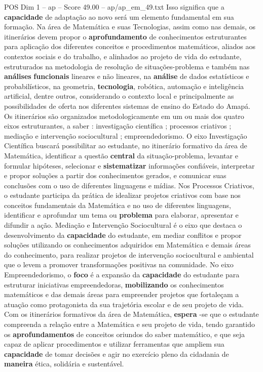 \begin{textsample}{POS Dim 1 – ap – Score 49.00 – ap/ap\_em\_49.txt}
Isso significa que a \textbf{capacidade} de adaptação ao novo será um elemento fundamental em sua formação.
Na área de Matemática e suas Tecnologias, assim como nas demais, os itinerários devem propor o \textbf{aprofundamento} de conhecimentos estruturantes para aplicação dos diferentes conceitos e procedimentos matemáticos, aliados aos contextos sociais e do trabalho, e alinhados ao projeto de vida do estudante, estruturados na metodologia de resolução de situações-problema e também nas \textbf{análises} \textbf{funcionais} lineares e não lineares, na \textbf{análise} de dados estatísticos e probabilísticos, na geometria, \textbf{tecnologia}, robótica, automação e inteligência artificial, dentre outros, considerando o contexto local e principalmente as possibilidades de oferta nos diferentes sistemas de ensino do Estado do Amapá.
Os itinerários são organizados metodologicamente em um ou mais dos quatro eixos estruturantes, a saber : investigação científica ; processos criativos ; mediação e intervenção sociocultural ; empreendedorismo.
O eixo Investigação Científica buscará possibilitar ao estudante, no itinerário formativo da área de Matemática, identificar a questão \textbf{central} da situação-problema, levantar e formular hipóteses, selecionar e \textbf{sistematizar} informações confiáveis, interpretar e propor soluções a partir dos conhecimentos gerados, e comunicar suas conclusões com o uso de diferentes linguagens e mídias.
Nos Processos Criativos, o estudante participa da prática de idealizar projetos criativos com base nos conceitos fundamentais da Matemática e no uso de diferentes linguagens, identificar e aprofundar um tema ou \textbf{problema} para elaborar, apresentar e difundir a ação.
Mediação e Intervenção Sociocultural é o eixo que destaca o desenvolvimento da \textbf{capacidade} do estudante, em mediar conflitos e propor soluções utilizando os conhecimentos adquiridos em Matemática e demais áreas do conhecimento, para realizar projetos de intervenção sociocultural e ambiental que o levem a promover transformações positivas na comunidade.
No eixo Empreendedorismo, o \textbf{foco} é a expansão da \textbf{capacidade} do estudante para estruturar iniciativas empreendedoras, \textbf{mobilizando} os conhecimentos matemáticos e das demais áreas para empreender projetos que fortaleçam a atuação como protagonista da sua trajetória escolar e de seu projeto de vida.
Com os itinerários formativos da área de Matemática, \textbf{espera} -se que o estudante compreenda a relação entre a Matemática e seu projeto de vida, tendo garantido os \textbf{aprofundamentos} de conceitos oriundos do saber matemático, e que seja capaz de aplicar procedimentos e utilizar ferramentas que ampliem sua \textbf{capacidade} de tomar decisões e agir no exercício pleno da cidadania de \textbf{maneira} ética, solidária e sustentável.

\end{textsample}

